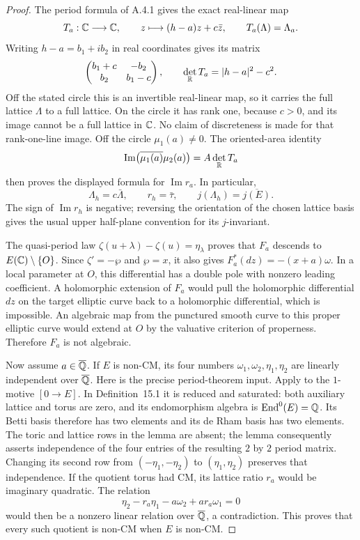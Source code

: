 \begin{proof}
The period formula of A.4.1 gives the exact real-linear map
\[
 T_a:\mathbb C\longrightarrow\mathbb C,\qquad
 z\longmapsto(h-a)z+c\bar z,
 \qquad T_a(\Lambda)=\Lambda_a.
\]
Writing $h-a=b_1+ib_2$ in real coordinates gives its matrix
\[
 \begin{pmatrix}b_1+c&-b_2\\ b_2&b_1-c\end{pmatrix},
 \qquad \det_{\mathbb R}T_a=|h-a|^2-c^2.
\]
Off the stated circle this is an invertible real-linear map, so it
carries the full lattice $\Lambda$ to a full lattice. On the circle it
has rank one, because $c>0$, and its image cannot be a full lattice in
$\mathbb C$. No claim of discreteness is made for that rank-one-line image.
Off the circle $\mu_1(a)\ne0$. The oriented-area identity
\[
 \operatorname{Im}\bigl(\overline{\mu_1(a)}\mu_2(a)\bigr)
       =A\det_{\mathbb R}T_a
\]
then proves the displayed formula for $\operatorname{Im}r_a$.
In particular,
\[
 \Lambda_h=c\bar\Lambda,\qquad r_h=\bar\tau,\qquad
 j(\Lambda_h)=\overline{j(E)}.
\]
The sign of $\operatorname{Im}r_h$ is negative; reversing the
orientation of the chosen lattice basis gives the usual upper
half-plane convention for its $j$-invariant.

The quasi-period law
$\zeta(u+\lambda)-\zeta(u)=\eta_\lambda$ proves that $F_a$ descends to
$E(\mathbb C)\setminus\{O\}$. Since $\zeta'=-\wp$ and $\wp=x$, it also gives
$F_a^*(dz)=-(x+a)\omega$. In a local parameter at $O$, this differential
has a double pole with nonzero leading coefficient. A holomorphic
extension of $F_a$ would pull the holomorphic differential $dz$ on the
target elliptic curve back to a holomorphic differential, which is
impossible. An algebraic map from the punctured smooth curve to this
proper elliptic curve would extend at $O$ by the valuative criterion
of properness. Therefore $F_a$ is not algebraic.

Now assume $a\in\overline{\mathbb Q}$. If $E$ is non-CM, its four numbers
$\omega_1,\omega_2,\eta_1,\eta_2$ are linearly independent over $\overline{\mathbb Q}$.
Here is the precise period-theorem input. Apply
\cite[Lemma 15.6, pp.136--138 of the opened manuscript]{EllHuberWustholz2022}
to the $1$-motive $[0\to E]$. In Definition~15.1 it is reduced and
saturated: both auxiliary lattice and torus are zero, and its
endomorphism algebra is $\operatorname{End}^0(E)=\mathbb Q$.
Its Betti basis therefore has two elements and its de Rham basis has
two elements. The toric and lattice rows in the lemma are absent;
the lemma consequently asserts independence of the four entries of
the resulting $2$ by $2$ period matrix. Changing its second row from
$(-\eta_1,-\eta_2)$ to $(\eta_1,\eta_2)$ preserves that independence.
If the quotient torus had CM, its lattice ratio $r_a$ would be
imaginary quadratic. The relation
\[
 \eta_2-r_a\eta_1-a\omega_2+a r_a\omega_1=0
\]
would then be a nonzero linear relation over $\overline{\mathbb Q}$, a contradiction.
This proves that every such quotient is non-CM when $E$ is non-CM.


\end{proof}
